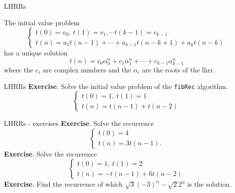 \documentclass{beamer}
\begin{document}
%

\begin{frame}{LHRRs}
	\begin{thm}[1]\label{thmhr}
		The initial value problem
		\begin{displaymath}
			\begin{cases}
				t(0)= v_0,\ t(1)= v_1,\cdots t(k-1)= v_{k-1}\\
				t(n)= a_1t(n-1) + \cdots + a_{k-1}t(n-k+1) + a_kt(n-k)
			\end{cases}
		\end{displaymath}
		has a unique solution
		\begin{equation*}
			t(n) = c_0\alpha_0^n + c_1\alpha_1^n + \cdots + c_{k-1}\alpha_{k-1}^n
		\end{equation*}
		where the $c_i$ are complex numbers and the $\alpha_i$ are the roots of
		the lhrr.
	\end{thm}
\end{frame}

\begin{frame}{LHRRs}
	\textbf{Exercise}. Solve the initial value problem of the \texttt{fibRec}
	algorithm.
	\begin{displaymath}
		\begin{cases}
			t(0)= 1,\ t(1)= 1\\
			t(n)= t(n-1) + t(n-2)
		\end{cases}
	\end{displaymath}
\end{frame}

\begin{frame}{LHRRs - exercises}
	\textbf{Exercise}. Solve the recurrence
	\begin{displaymath}
		\begin{cases}
			t(0)= 4\\
			t(n)= 3t(n-1).
		\end{cases}
	\end{displaymath}
	\textbf{Exercise}. Solve the recurrence
	\begin{displaymath}
		\begin{cases}
			t(0)= 1,\ t(1)= 2\\
			t(n)= -t(n-1) + 6t(n-2)
		\end{cases}
	\end{displaymath}
	\textbf{Exercise}. Find the recurrence of which $\sqrt{3}(-3)^n - \sqrt{2}2^n$
	is the solution.
\end{frame}

%
\end{document}

